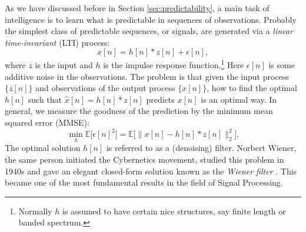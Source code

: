 \documentclass[../../book-main.tex]{subfiles}
\begin{document}
As we have discussed before in Section \ref{sec:predictability}, a main task of intelligence is to learn what is predictable in sequences of observations. Probably the simplest class  of predictable sequences, or signals, are generated via a {\em linear time-invariant} (LTI) process:
\begin{equation}
    x[n] = h[n]*z[n] + \epsilon[n], 
    \label{eqn:Wiener-model}
\end{equation}
where $z$ is the input and $h$ is the impulse response function.\footnote{Normally $h$ is assumed to have certain nice structures, say finite length or banded spectrum.}  Here $\epsilon[n]$ is some additive noise in the observations. The problem is that given the input process  $\{z[n]\}$ and observations of the output process $\{x[n]\}$, how to find the optimal $h[n]$ such that $\hat x[n] = h[n]*z[n]$ predicts $x[n]$ is an optimal way. In general, we measure the goodness of the prediction by the minimum mean squared error (MMSE):
\begin{equation}
    \min_{h} \mathbb{E} \big[\epsilon[n]^2\big] = \mathbb{E} \big[\|x[n] - h[n]*z[n]\|_2^2\big].
\end{equation}
The optimal solution $h[n]$ is referred to as a (denoising) filter. Norbert Wiener, the same person initiated the Cybernetics movement, studied this problem in 1940s and gave an elegant closed-form  solution known as the {\em Wiener filter} \cite{Wiener-1942,Wiener-1949}. This became one of the most fundamental results in the field of  Signal Processing.
\end{document}
